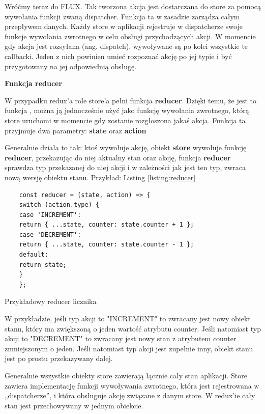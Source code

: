 Wróćmy teraz do FLUX. Tak tworzona akcja jest dostarczana do store za pomocą wywołania funkcji zwaną dispatcher. Funkcja ta w zasadzie zarządza całym przepływem danych. Każdy store w aplikacji rejestruje w dispatcherze swoje funkcje wywołania zwrotnego w celu obsługi przychodzących akcji. W momencie gdy akcja jest rozsyłana (ang. dispatch), wywoływane są po kolei wszystkie te callbacki. Jeden z nich powinien umieć rozpoznać akcję po jej typie i być przygotowany na jej odpowiednią obsługę.

\begin{center}
	\textbf{Funkcja reducer}
\end{center}

W przypadku redux'a role store'a pełni funkcja \textbf{reducer}. Dzięki temu, że jest to funkcja , można ją jednocześnie użyć jako funkcję wywołania zwrotnego, którą store uruchomi w momencie gdy zostanie rozgłoszona jakaś akcja. Funkcja ta przyjmuje dwa parametry: \textbf{state} oraz \textbf{action}

Generalnie działa to tak: ktoś wywołuje akcję, obiekt \textbf{store} wywołuje funkcję \textbf{reducer}, przekazując do niej aktualny stan oraz akcję, funkcja \textbf{reducer} sprawdza typ przekazanej do niej akcji i w zależności jak jest ten typ, zwraca nową wersję obiektu stanu. Przykład: Listing \ref{listing:reducer} 

\begin{listing}
	\begin{verbatim}
	const reducer = (state, action) => {
	switch (action.type) {
	case 'INCREMENT':
	return { ...state, counter: state.counter + 1 };
	case 'DECREMENT':
	return { ...state, counter: state.counter - 1 };
	default:
	return state;
	}
	};
	\end{verbatim}
	\caption{Przykładowy reducer licznika} \label{listing:reducer}
\end{listing}

W przykładzie, jeśli typ akcji to "INCREMENT" to zwracany jest nowy obiekt stanu, który ma zwiększoną o jeden wartość atrybutu counter. Jeśli natomiast typ akcji to "DECREMENT" to zwracany jest nowy stan z atrybutem counter zmniejszonym o jeden. Jeśli natomiast typ akcji jest zupełnie inny, obiekt stanu jest po prostu przekazywany dalej.

Generalnie wszystkie obiekty store zawierają łącznie cały stan aplikacji. Store zawiera implementację funkcji wywoływania zwrotnego, która jest rejestrowana w „dispatcherze”, i która obsługuje akcję związane z danym store.
W redux'ie cały stan jest przechowywany w jednym obiekcie.

